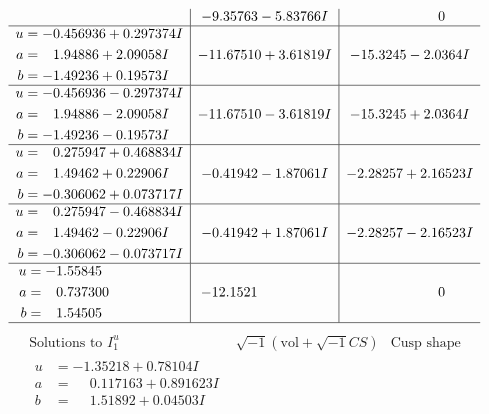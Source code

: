 \documentclass[1p]{elsarticle_modified}
\theoremstyle{definition}
\newcommand{\I}{\sqrt{-1}}
\begin{document}
$$\begin{array}{c|c|c}
 & -9.35763 - 5.83766 I & \phantom{-0.000000 } 0 \\ \hline\begin{aligned}
u &= -0.456936 + 0.297374 I \\
a &= \phantom{-}1.94886 + 2.09058 I \\
b &= -1.49236 + 0.19573 I\end{aligned}
 & -11.67510 + 3.61819 I & -15.3245 - 2.0364 I \\ \hline\begin{aligned}
u &= -0.456936 - 0.297374 I \\
a &= \phantom{-}1.94886 - 2.09058 I \\
b &= -1.49236 - 0.19573 I\end{aligned}
 & -11.67510 - 3.61819 I & -15.3245 + 2.0364 I \\ \hline\begin{aligned}
u &= \phantom{-}0.275947 + 0.468834 I \\
a &= \phantom{-}1.49462 + 0.22906 I \\
b &= -0.306062 + 0.073717 I\end{aligned}
 & -0.41942 - 1.87061 I & -2.28257 + 2.16523 I \\ \hline\begin{aligned}
u &= \phantom{-}0.275947 - 0.468834 I \\
a &= \phantom{-}1.49462 - 0.22906 I \\
b &= -0.306062 - 0.073717 I\end{aligned}
 & -0.41942 + 1.87061 I & -2.28257 - 2.16523 I \\ \hline\begin{aligned}
u &= -1.55845\phantom{ +0.000000I} \\
a &= \phantom{-}0.737300\phantom{ +0.000000I} \\
b &= \phantom{-}1.54505\phantom{ +0.000000I}\end{aligned}
 & -12.1521\phantom{ +0.000000I} & \phantom{-0.000000 } 0\\
 \hline 
 \end{array}$$\newpage$$\begin{array}{c|c|c}  
\text{Solutions to }I^u_{1}& \I (\text{vol} + \sqrt{-1}CS) & \text{Cusp shape}\\
 \hline 
\begin{aligned}
u &= -1.35218 + 0.78104 I \\
a &= \phantom{-}0.117163 + 0.891623 I \\
b &= \phantom{-}1.51892 + 0.04503 I\end{aligned}

\end{array}$$
\end{document}
